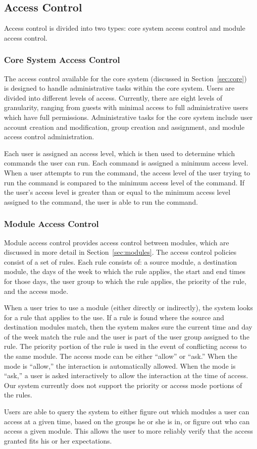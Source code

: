\subsection{Access Control}
\label{sec:access}
Access control is divided into two types: core system access control and module
access control.
\subsubsection{Core System Access Control}
\label{sec:core_access}
The access control available for the core system (discussed in
Section~\ref{sec:core}) is designed to handle administrative tasks within the
core system. Users are divided into different levels of access. Currently, there
are eight levels of granularity, ranging from guests with minimal access to
full administrative users which have full permissions. Administrative tasks for
the core system include user account creation and modification, group creation
and assignment, and module access control administration.

Each user is assigned an access level, which is then used to determine which
commands the user can run. Each command is assigned a minimum access level.
When a user attempts to run the command, the access level of the user trying to
run the command is compared to the minimum access level of the command. If the
user's access level is greater than or equal to the minimum access level
assigned to the command, the user is able to run the command.
\subsubsection{Module Access Control}
Module access control provides access control between modules, which are
discussed in more detail in Section~\ref{sec:modules}. The access control
policies consist of a set of rules. Each rule consists of: a source module, a
destination module, the days of the week to which the rule applies, the start
and end times for those days, the user group to which the rule applies, the
priority of the rule, and the access mode.

When a user tries to use a module (either directly or indirectly), the system
looks for a rule that applies to the use. If a rule is found where the source
and destination modules match, then the system makes sure the current time and
day of the week match the rule and the user is part of the user group assigned
to the rule. The priority portion of the rule is used in the event of
conflicting access to the same module. The access mode can be either ``allow''
or ``ask.'' When the mode is ``allow,'' the interaction is automatically
allowed. When the mode is ``ask,'' a user is asked interactively to allow the
interaction at the time of access. Our system currently does not support the
priority or access mode portions of the rules.

Users are able to query the system to either figure out which modules a user can
access at a given time, based on the groups he or she is in, or figure out who
can access a given module. This allows the user to more reliably verify that the
access granted fits his or her expectations.
